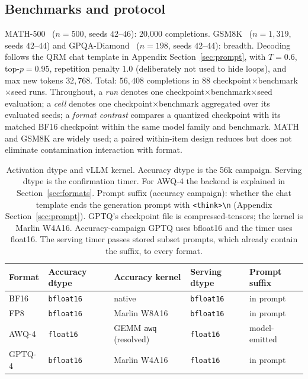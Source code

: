 \documentclass[11pt,a4paper]{article}
\begin{document}
\subsection{Benchmarks and protocol}
MATH-500~\cite{hendrycks2021math,lightman2023lets} ($n=500$, seeds $42$--$46$): 20{,}000 completions. GSM8K~\cite{cobbe2021gsm8k} ($n=1{,}319$, seeds $42$--$44$) and GPQA-Diamond~\cite{rein2023gpqa} ($n=198$, seeds $42$--$44$): breadth. Decoding follows the QRM chat template in Appendix Section~\ref{sec:prompt}, with $T=0.6$, top-$p=0.95$, repetition penalty $1.0$ (deliberately not used to hide loops), and max new tokens $32{,}768$. Total: $56{,}408$ completions in 88 checkpoint$\times$benchmark$\times$seed runs. Throughout, a \emph{run} denotes one checkpoint$\times$benchmark$\times$seed evaluation; a \emph{cell} denotes one checkpoint$\times$benchmark aggregated over its evaluated seeds; a \emph{format contrast} compares a quantized checkpoint with its matched BF16 checkpoint within the same model family and benchmark. MATH and GSM8K are widely used; a paired within-item design reduces but does not eliminate contamination interaction with format.

\begin{table}[t]
\centering
\caption{Activation dtype and vLLM kernel. Accuracy dtype is the 56k campaign. Serving dtype is the confirmation timer. For AWQ-4 the backend is explained in Section~\ref{sec:formats}. Prompt suffix (accuracy campaign): whether the chat template ends the generation prompt with \texttt{<think>\textbackslash n} (Appendix Section~\ref{sec:prompt}). GPTQ's checkpoint file is compressed-tensors; the kernel is Marlin W4A16. Accuracy-campaign GPTQ uses bfloat16 and the timer uses float16. The serving timer passes stored subset prompts, which already contain the suffix, to every format.}
\label{tab:dtype}
\small
\begin{tabular}{lllll}
\toprule
\textbf{Format} & \textbf{Accuracy dtype} & \textbf{Accuracy kernel} & \textbf{Serving dtype} & \textbf{Prompt suffix} \\
\midrule
BF16 & \texttt{bfloat16} & native & \texttt{bfloat16} & in prompt \\
FP8 & \texttt{bfloat16} & Marlin W8A16 & \texttt{bfloat16} & in prompt \\
AWQ-4 & \texttt{float16} & GEMM \texttt{awq} (resolved) & \texttt{float16} & model-emitted \\
GPTQ-4 & \texttt{bfloat16} & Marlin W4A16 & \texttt{float16} & in prompt \\
\bottomrule
\end{tabular}
\end{table}
\end{document}
